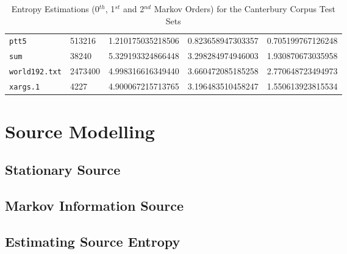 \documentclass[a4paper, twocolumn]{article}
\begin{document}
\begin{table*}[t]
\begin{tabular}{lllll}
            \texttt{ptt5} & 513216 & 1.210175035218506 & 0.823658947303357 & 0.705199767126248 \\
            \texttt{sum} & 38240 & 5.329193324866448 & 3.298284974946003 & 1.930870673035958 \\
            \texttt{world192.txt} & 2473400 & 4.998316616349440 & 3.660472085185258 & 2.770648723494973 \\
            \texttt{xargs.1} & 4227 & 4.900067215713765 & 3.196483510458247 & 1.550613923815534 \\
        \bottomrule
        \end{tabular}
        \caption{Entropy Estimations (0$^{th}$, 1$^{st}$ and 2$^{nd}$ Markov Orders) for the Canterbury Corpus Test Sets}
        \label{tab:canterbury}
    \end{table*}

    \section{Source Modelling} \label{sec:source_modelling}
        \subsection{Stationary Source} \label{sec:stationary_source}
        \subsection{Markov Information Source} \label{sec:markov_information_source}
        \subsection{Estimating Source Entropy} \label{sec:estimating_source_entropy}
\end{document}
